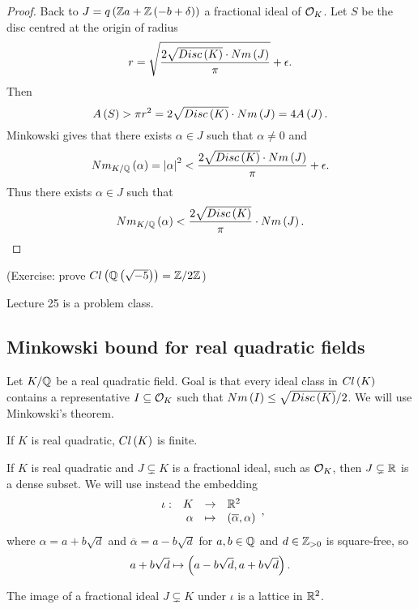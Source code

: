 \begin{proof}
Back to $ J = q\left( \mathbb{Z} a + \mathbb{Z}\left( -b + \delta \right) \right) $ a fractional ideal of $ \mathcal{O}_K $. Let $ S $ be the disc centred at the origin of radius
$$ r = \sqrt{\dfrac{2\sqrt{Disc\left( K \right)} \cdot Nm\left( J \right)}{\pi}} + \epsilon. $$
Then
$$ A\left( S \right) > \pi r^2 = 2\sqrt{Disc\left( K \right)} \cdot Nm\left( J \right) = 4A\left( J \right). $$
Minkowski gives that there exists $ \alpha \in J $ such that $ \alpha \ne 0 $ and
$$ Nm_{K / \mathbb{Q}}\left( \alpha \right) = \left\lvert \alpha \right\rvert^2 < \dfrac{2\sqrt{Disc\left( K \right)} \cdot Nm\left( J \right)}{\pi} + \epsilon. $$
Thus there exists $ \alpha \in J $ such that
$$ Nm_{K / \mathbb{Q}}\left( \alpha \right) < \dfrac{2\sqrt{Disc\left( K \right)}}{\pi} \cdot Nm\left( J \right). $$
\end{proof}

(Exercise: prove $ Cl\left( \mathbb{Q}\left( \sqrt{-5} \right) \right) = \mathbb{Z} / 2\mathbb{Z} $)


Lecture 25 is a problem class.

\subsection{Minkowski bound for real quadratic fields}


Let $ K / \mathbb{Q} $ be a real quadratic field. Goal is that every ideal class in $ Cl\left( K \right) $ contains a representative $ I \subseteq \mathcal{O}_K $ such that $ Nm\left( I \right) \le \sqrt{Disc\left( K \right)} / 2 $. We will use Minkowski's theorem.

\begin{corollary}
If $ K $ is real quadratic, $ Cl\left( K \right) $ is finite.
\end{corollary}

If $ K $ is real quadratic and $ J \subsetneq K $ is a fractional ideal, such as $ \mathcal{O}_K $, then $ J \subsetneq \mathbb{R} $ is a dense subset. We will use instead the embedding
$$ \function[\iota]{K}{\R^2}{\alpha}{\rb{\overline{\alpha}, \alpha}}, $$
where $ \alpha = a + b\sqrt{d} $ and $ \overline{\alpha} = a - b\sqrt{d} $ for $ a, b \in \mathbb{Q} $ and $ d \in \mathbb{Z}_{> 0} $ is square-free, so
$$ a + b\sqrt{d} \mapsto \left( a - b\sqrt{d}, a + b\sqrt{d} \right). $$

\begin{lemma}
The image of a fractional ideal $ J \subsetneq K $ under $ \iota $ is a lattice in $ \mathbb{R}^2 $.
\end{lemma}

